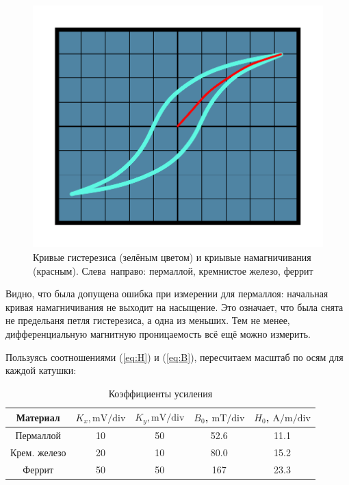\documentclass[12pt, a4paper]{article}
\begin{document}
\begin{figure}[H]
\begin{minipage}{.33\textwidth}
    \includegraphics[width=.95\linewidth]{pics/Ferrit.pdf}
  \end{minipage}
  \centering
  \caption{\centering Кривые гистерезиса (зелёным цветом) и криывые намагничивания (красным). Слева~направо: пермаллой, кремнистое железо, феррит}
  \label{fig:curves}
\end{figure}

Видно, что была допущена ошибка при измерении для пермаллоя: начальная кривая намагничивания не выходит на насыщение.
Это означает, что была снята не предельаня петля гистерезиса, а одна из меньших. Тем не менее, дифференциальную магнитную проницаемость
всё ещё можно измерить.

Пользуясь соотношениями (\ref{eq:H}) и (\ref{eq:B}), пересчитаем масштаб по осям для каждой катушки:
\begin{table}[H]
  \centering
  \begin{tabular}{|c|c|c|c|c|}
    \hline
    Материал      & $K_x, \mathrm{mV/div}$
    & $K_y, \mathrm{mV/div}$
    & $B_0$, $\mathrm{mT/div}$
    & $H_0$, $\mathrm{A/m/div}$ \\ \hline
    Пермаллой     & 10 & 50 & 52.6 & 11.1     \\ \hline
    Крем. железо  & 20 & 10 & 80.0 & 15.2     \\ \hline
    Феррит        & 50 & 50 & 167  & 23.3     \\ \hline
  \end{tabular}
  \caption{Коэффициенты усиления}
  \label{tab:ampl_cefs}
\end{table}
\end{document}
